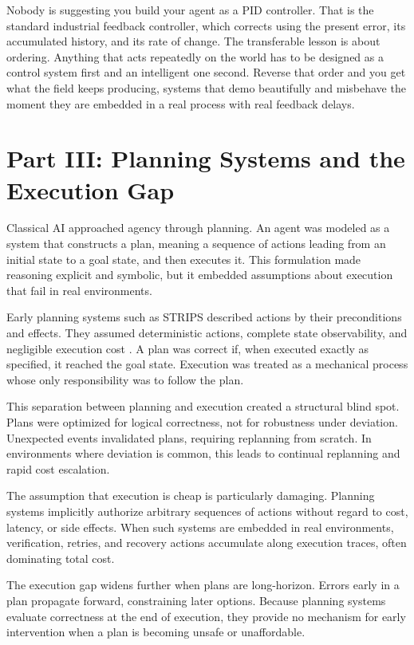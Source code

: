 Nobody is suggesting you build your agent as a PID controller. That is the standard industrial feedback controller, which corrects using the present error, its accumulated history, and its rate of change. The transferable
lesson is about ordering. Anything that acts repeatedly on the world has to be
designed as a control system first and an intelligent one second. Reverse that
order and you get what the field keeps producing, systems that demo beautifully
and misbehave the moment they are embedded in a real process with real feedback
delays.

\section{Part III: Planning Systems and the Execution Gap}

Classical AI approached agency through planning. An agent was modeled as a system that constructs a plan, meaning a sequence of actions leading from an initial state to a goal state, and then executes it. This formulation made reasoning explicit and
symbolic, but it embedded assumptions about execution that fail in real
environments.

Early planning systems such as STRIPS described actions by their preconditions and effects. They assumed deterministic actions, complete state observability, and negligible execution cost \cite{fikes1971strips}. A plan
was correct if, when executed exactly as specified, it reached the goal state.
Execution was treated as a mechanical process whose only responsibility was to
follow the plan.

This separation between planning and execution created a structural blind spot.
Plans were optimized for logical correctness, not for robustness under deviation.
Unexpected events invalidated plans, requiring replanning from scratch. In
environments where deviation is common, this leads to continual replanning and
rapid cost escalation.

The assumption that execution is cheap is particularly damaging. Planning systems
implicitly authorize arbitrary sequences of actions without regard to cost,
latency, or side effects. When such systems are embedded in real environments,
verification, retries, and recovery actions accumulate along execution traces,
often dominating total cost.

The execution gap widens further when plans are long-horizon. Errors early in a
plan propagate forward, constraining later options. Because planning systems
evaluate correctness at the end of execution, they provide no mechanism for early
intervention when a plan is becoming unsafe or unaffordable.

